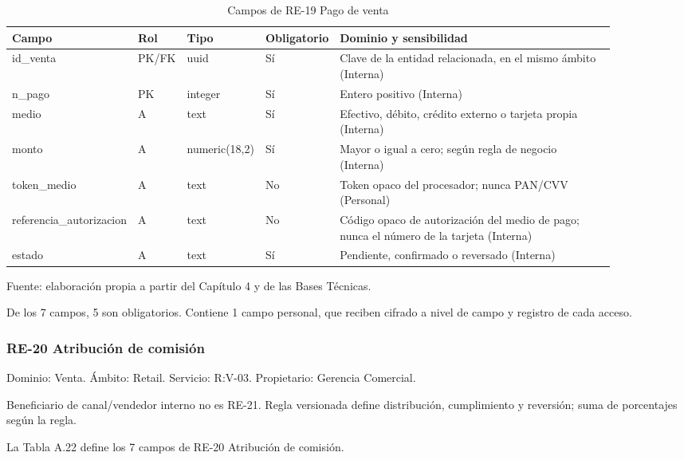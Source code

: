 \documentclass[11pt]{article}
\begin{document}
\begin{table}[htbp]
\caption{Campos de RE-19 Pago de venta}\label{tab:d_re19}
\centering
\begin{tabular}{@{}p{0.167\linewidth}p{0.070\linewidth}p{0.079\linewidth}p{0.097\linewidth}p{0.465\linewidth}@{}}
\toprule Campo & Rol & Tipo & Obligatorio & Dominio y sensibilidad \\
\midrule
id\_venta & PK/FK & uuid & Sí & Clave de la entidad relacionada, en el mismo ámbito (Interna) \\
n\_pago & PK & integer & Sí & Entero positivo (Interna) \\
medio & A & text & Sí & Efectivo, débito, crédito externo o tarjeta propia (Interna) \\
monto & A & numeric(18,2) & Sí & Mayor o igual a cero; según regla de negocio (Interna) \\
token\_medio & A & text & No & Token opaco del procesador; nunca PAN/CVV (Personal) \\
referencia\_autorizacion & A & text & No & Código opaco de autorización del medio de pago; nunca el número de la tarjeta (Interna) \\
estado & A & text & Sí & Pendiente, confirmado o reversado (Interna) \\
\bottomrule
\end{tabular}
\par\smallskip
{\raggedright Fuente: elaboración propia a partir del Capítulo 4 y de las Bases Técnicas.\par}
\end{table}


De los 7 campos, 5 son obligatorios. Contiene 1 campo personal, que reciben cifrado a nivel de campo y registro de cada acceso.

\subsubsection{RE-20 Atribución de comisión}

Dominio: Venta. Ámbito: Retail. Servicio: R:V-03. Propietario: Gerencia Comercial.

Beneficiario de canal/vendedor interno no es RE-21. Regla versionada define distribución, cumplimiento y reversión; suma de porcentajes según la regla.

La Tabla A.22 define los 7 campos de RE-20 Atribución de comisión.
\end{document}
